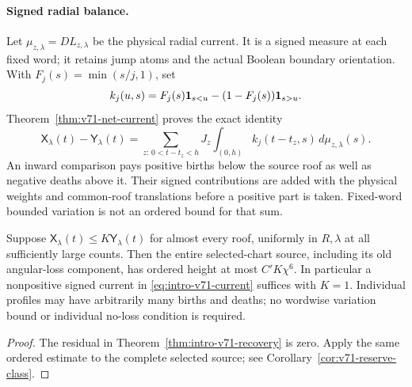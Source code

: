 \paragraph{Signed radial balance.}
Let $\mu_{z,\lambda}=DL_{z,\lambda}$ be the physical radial
current. It is a signed measure at each fixed word; it retains jump
atoms and the actual Boolean boundary orientation. With
$F_j(s)=\min(s/j,1)$, set
\[
 k_j(u,s)=F_j(s)\mathbf1_{s<u}-(1-F_j(s))\mathbf1_{s>u}.
\]
Theorem~\ref{thm:v71-net-current} proves the exact identity
\begin{equation}\label{eq:intro-v71-current}
 \mathsf X_\lambda(t)-\mathsf Y_\lambda(t)
  =\sum_{z:\,0<t-t_z<h}J_z
         \int_{(0,h)}k_j(t-t_z,s)\,d\mu_{z,\lambda}(s).
\end{equation}
An inward comparison pays positive births below the source roof as
well as negative deaths above it. Their signed contributions are added
with the physical weights and common-roof translations before a
positive part is taken. Fixed-word bounded variation is not an ordered
bound for that sum.

\begin{leadtheorem}
\label{thm:intro-v71-reserve}
Suppose $\mathsf X_\lambda(t)\le K\mathsf Y_\lambda(t)$ for
almost every roof, uniformly in $R,\lambda$ at all sufficiently
large counts. Then the entire selected-chart source, including its
old angular-loss component, has ordered height at most $C'K\chi^6$.
In particular a nonpositive signed current in
\eqref{eq:intro-v71-current} suffices with $K=1$. Individual
profiles may have arbitrarily many births and deaths; no wordwise
variation bound or individual no-loss condition is required.
\end{leadtheorem}
\begin{proof}
The residual in Theorem~\ref{thm:intro-v71-recovery} is zero.
Apply the same ordered estimate to the complete selected source;
see Corollary~\ref{cor:v71-reserve-class}.
\end{proof}


